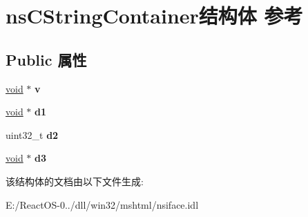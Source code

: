 \hypertarget{structns_c_string_container}{}\section{ns\+C\+String\+Container结构体 参考}
\label{structns_c_string_container}
\subsection*{Public 属性}
\begin{DoxyCompactItemize}
\item 
\mbox{\label{structns_c_string_container_ae6028808e0e3e0d3a044b334b5280402}} 
\hyperlink{interfacevoid}{void} $\ast$ {\bfseries v}
\item 
\mbox{\label{structns_c_string_container_aa36dae239a906f27ebdf852769ee2c9b}} 
\hyperlink{interfacevoid}{void} $\ast$ {\bfseries d1}
\item 
\mbox{\label{structns_c_string_container_a1d693ea1a26463c51043fbbabf5ede68}} 
uint32\+\_\+t {\bfseries d2}
\item 
\mbox{\label{structns_c_string_container_a889ede167176e137fe375220240d38ff}} 
\hyperlink{interfacevoid}{void} $\ast$ {\bfseries d3}
\end{DoxyCompactItemize}


该结构体的文档由以下文件生成\+:\begin{DoxyCompactItemize}
\item 
E\+:/\+React\+O\+S-\/0../dll/win32/mshtml/nsiface.\+idl\end{DoxyCompactItemize}
